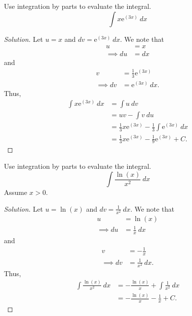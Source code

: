 \documentclass[compacto,10pt,comentarios]{aleph-notas}
\begin{document}
\begin{ejer}
    Use integration by parts to evaluate the integral.
    $$
        \int x \mathrm{e}^{(3x)} ~ dx
    $$
\end{ejer}
\begin{proof}[Solution]
    Let $u = x$ and $dv = \mathrm{e}^{(3x)} ~ dx$. We note that
    \begin{align*}
        u & = x \\ 
        \implies du & = dx
    \end{align*}
    and
    \begin{align*}     
        v & = \frac{1}{3} \mathrm{e}^{(3x)} \\ 
        \implies dv & = \mathrm{e}^{(3x)} ~ dx.
    \end{align*}
    Thus,
    \begin{align*}
        \int x \mathrm{e}^{(3x)} ~ dx 
        & = \int u ~ dv \\
        & =  uv - \int v ~ du \\
        & = \frac{1}{3}x\mathrm{e}^{(3x)} - \frac{1}{3} \int \mathrm{e}^{(3x)} ~ dx \\ 
        & = \frac{1}{3}x\mathrm{e}^{(3x)} - \frac{1}{9} \mathrm{e}^{(3x)} + C .
    \end{align*}
\end{proof}

\begin{ejer}
    Use integration by parts to evaluate the integral.
    $$
        \int \frac{\ln(x)}{x^{2}} ~ dx
    $$
    Assume $x > 0$.
\end{ejer}
\begin{proof}[Solution]
    Let $u = \ln(x)$ and $dv = \frac{1}{x^{2}} ~ dx$. We note that
    \begin{align*}
        u & = \ln(x) \\ 
        \implies du & = \frac{1}{x} ~ dx
    \end{align*}
    and
    \begin{align*}     
        v & = -\frac{1}{x} \\ 
        \implies dv & = \frac{1}{x^{2}} ~ dx.
    \end{align*}
    Thus,
    \begin{align*}
        \int \frac{\ln(x)}{x^{2}} ~ dx
        & = -\frac{\ln(x)}{x} + \int \frac{1}{x^2}~dx \\
        & =  -\frac{\ln(x)}{x} - \frac{1}{x} + C .
    \end{align*}
\end{proof}
\end{document}
